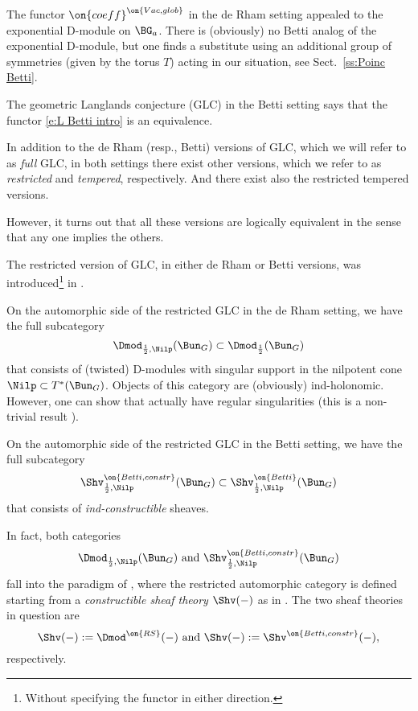\documentclass[9pt]{amsart}
\theoremstyle{remark}
\theoremstyle{definition}
\theoremstyle{remark}
\newcommand{\secref}[1]{Sect.~\ref{#1}}
\numberwithin{equation}{section}
\begin{document}
\medskip

The functor $\on{coeff}^{\on{Vac,glob}}$
in the de Rham setting appealed to the exponential D-module on $\BG_a$. There is (obviously) no Betti analog
of the exponential D-module, but one finds a
substitute using an additional group of symmetries (given by the torus $T$) acting in our situation, see
\secref{ss:Poinc Betti}. 

\sssec{}

The geometric Langlands conjecture (GLC) in the Betti setting says that the functor \eqref{e:L Betti intro}
is an equivalence. 

 \label{ss:comparison Intro} 

In addition to the de Rham (resp., Betti) versions of GLC, which we will refer to as \emph{full} GLC, in both settings
there exist other versions, which we refer to as \emph{restricted} and \emph{tempered}, respectively. And there exist
also the restricted tempered versions. 

\medskip

However, it turns out that all these versions are logically equivalent in the sense
that any one implies the others.

\sssec{}

The restricted version of GLC, in either de Rham or Betti versions, was introduced\footnote{Without specifying the functor in either
direction.} in \cite[Conjecture 21.2.7]{AGKRRV}. 

\medskip

On the automorphic side of the restricted GLC in the de Rham setting, we have the full subcategory
$$\Dmod_{\frac{1}{2},\Nilp}(\Bun_G)\subset \Dmod_{\frac{1}{2}}(\Bun_G)$$
that consists of (twisted) D-modules with singular support in the nilpotent cone $\Nilp\subset T^*(\Bun_G)$. 
Objects of this category are (obviously) ind-holonomic. However, one can show that actually
have regular singularities (this is a non-trivial result \cite[Corollary 16.5.6]{AGKRRV}).

\medskip

On the automorphic side of the restricted GLC in the Betti setting, we have the full subcategory 
$$\Shv^{\on{Betti,constr}}_{\frac{1}{2},\Nilp}(\Bun_G)\subset \Shv^{\on{Betti}}_{\frac{1}{2},\Nilp}(\Bun_G)$$
that consists of \emph{ind-constructible} sheaves.

\medskip

In fact, both categories 
$$\Dmod_{\frac{1}{2},\Nilp}(\Bun_G) \text{ and } \Shv^{\on{Betti,constr}}_{\frac{1}{2},\Nilp}(\Bun_G)$$
fall into the paradigm of \cite[Sect. 14.1]{AGKRRV}, where the restricted automorphic category is defined
starting from a \emph{constructible sheaf theory} $\Shv(-)$ as in \cite[Sect. 1.1.1]{AGKRRV}.
The two sheaf theories in question are
$$\Shv(-):=\Dmod^{\on{RS}}(-) \text{ and } \Shv(-):=\Shv^{\on{Betti,constr}}(-),$$
respectively.
\end{document}
